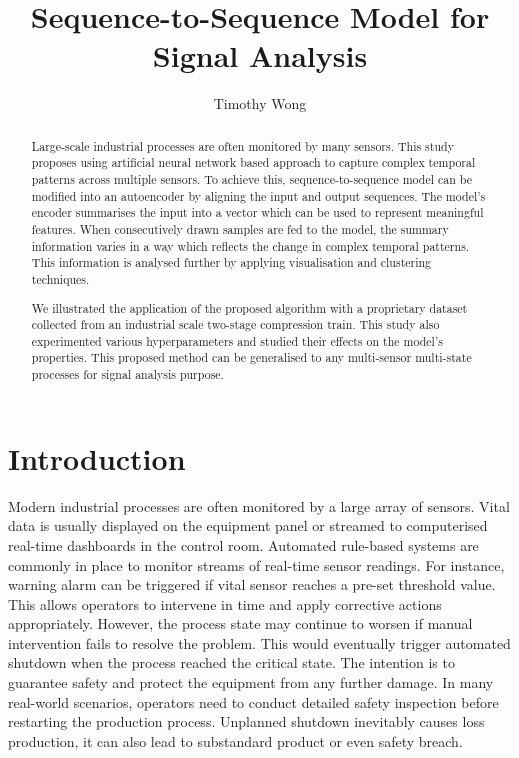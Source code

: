 \documentclass[11pt]{article} %
\title{Sequence-to-Sequence Model for Signal Analysis}
\author{Timothy Wong}
\theoremstyle{plain}
\theoremstyle{definition}
\begin{document}
\maketitle

\declaration

\begin{abstract}

Large-scale industrial processes are often monitored by many sensors. This study proposes using artificial neural network based approach to capture complex temporal patterns across multiple sensors. To achieve this, sequence-to-sequence model can be modified into an autoencoder by aligning the input and output sequences. The model's encoder summarises the input into a vector which can be used to represent meaningful features. When consecutively drawn samples are fed to the model, the summary information varies in a way which reflects the change in complex temporal patterns. This information is analysed further by applying visualisation and clustering techniques.

We illustrated the application of the proposed algorithm with a proprietary dataset collected from an industrial scale two-stage compression train. This study also experimented various hyperparameters and studied their effects on the model's properties. This proposed method can be generalised to any multi-sensor multi-state processes for signal analysis purpose.

\end{abstract}

\section{Introduction}

Modern industrial processes are often monitored by a large array of sensors. Vital data is usually displayed on the equipment panel or streamed to computerised real-time dashboards in the control room. Automated rule-based systems are commonly in place to monitor streams of real-time sensor readings. For instance, warning alarm can be triggered if vital sensor reaches a pre-set threshold value. This allows operators to intervene in time and apply corrective actions appropriately. However, the process state may continue to worsen if manual intervention fails to resolve the problem. This would eventually trigger automated shutdown when the process reached the critical state. The intention is to guarantee safety and protect the equipment from any further damage. In many real-world scenarios, operators need to conduct detailed safety inspection before restarting the production process. Unplanned shutdown inevitably causes loss production, it can also lead to substandard product or even safety breach.
\end{document}
